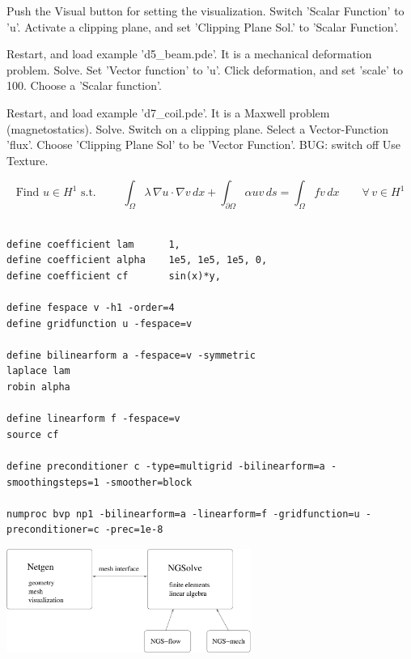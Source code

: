 \documentclass[20pt,landscape,footrule]{foils}
\newcommand\sectionname{}
\begin{document}
Push the Visual button for setting the visualization. Switch 'Scalar
Function' to 'u'. Activate a clipping plane, and set 'Clipping Plane
Sol.' to 'Scalar Function'.

Restart, and load example 'd5\_beam.pde'. It is a mechanical deformation problem. Solve. Set 'Vector function' to 'u'. Click deformation, and set 'scale' to 100. Choose a 'Scalar function'.

Restart, and load example 'd7\_coil.pde'. It is a Maxwell problem (magnetostatics). Solve. Switch on a clipping plane. Select a Vector-Function 'flux'. Choose 'Clipping Plane Sol' to be 'Vector Function'. BUG: switch off Use Texture.


\foilhead{\color{blue}
{\bf NGSolve script file for Poisson example} \\[-2em]}
%
$$
\mbox{Find } u \in H^1 \mbox{ s.t. } \qquad 
\int_\Omega \lambda \, \nabla u \cdot \nabla v \, dx + \int_{\partial \Omega} \alpha u v \, ds
= \int_\Omega f v \, dx \qquad \forall \, v \in H^1
$$
{
\small
\begin{verbatim}

define coefficient lam      1,
define coefficient alpha    1e5, 1e5, 1e5, 0, 
define coefficient cf       sin(x)*y,

define fespace v -h1 -order=4
define gridfunction u -fespace=v 

define bilinearform a -fespace=v -symmetric
laplace lam
robin alpha

define linearform f -fespace=v
source cf

define preconditioner c -type=multigrid -bilinearform=a -smoothingsteps=1 -smoother=block

numproc bvp np1 -bilinearform=a -linearform=f -gridfunction=u -preconditioner=c -prec=1e-8
\end{verbatim}
}


\hypertarget{programming}{}
\renewcommand\sectionname{NGSolve Programming}

\begin{center}
\includegraphics[width=0.6\textwidth]{interplay.pdf} 
\end{center}
\end{document}
